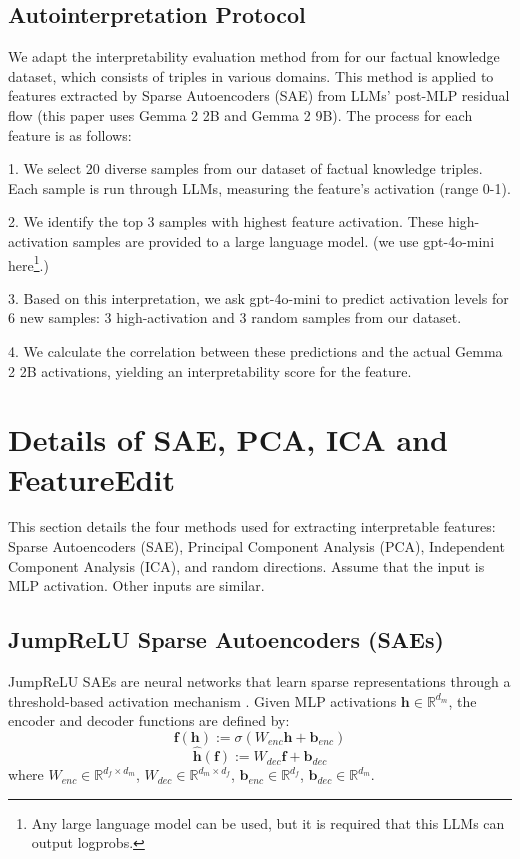 \subsection{Autointerpretation Protocol}
\label{subsection:appendix:Autointerpretation Protocol}
We adapt the interpretability evaluation method from \citet{bills2023language} for our factual knowledge dataset, which consists of triples in various domains. This method is applied to features extracted by Sparse Autoencoders (SAE) from LLMs' post-MLP residual flow (this paper uses Gemma 2 2B and Gemma 2 9B). The process for each feature is as follows:

1. We select 20 diverse samples from our dataset of factual knowledge triples. Each sample is run through LLMs, measuring the feature's activation (range 0-1).

2. We identify the top 3 samples with highest feature activation. These high-activation samples are provided to a large language model. (we use gpt-4o-mini here\footnote{Any large language model can be used, but it is required that this LLMs can output logprobs.}.)

3. Based on this interpretation, we ask gpt-4o-mini to predict activation levels for 6 new samples: 3 high-activation and 3 random samples from our dataset.

4. We calculate the correlation between these predictions and the actual Gemma 2 2B activations, yielding an interpretability score for the feature.
\section{Details of SAE, PCA, ICA and FeatureEdit}
\label{appendix:Details of SAE, PCA and ICA}

This section details the four methods used for extracting interpretable features: Sparse Autoencoders (SAE), Principal Component Analysis (PCA), Independent Component Analysis (ICA), and random directions. Assume that the input is MLP activation. Other inputs are similar.

\subsection{JumpReLU Sparse Autoencoders (SAEs)}
JumpReLU SAEs are neural networks that learn sparse representations through a threshold-based activation mechanism \citep{lieberum-etal-2024-gemma}. Given MLP activations $\mathbf{h} \in \mathbb{R}^{d_m}$, the encoder and decoder functions are defined by:
\begin{equation}
    \mathbf{f}(\mathbf{h}) := \sigma(W_{enc}\mathbf{h} + \mathbf{b}_{enc})
\end{equation}
\begin{equation}
    \hat{\mathbf{h}}(\mathbf{f}) := W_{dec}\mathbf{f} + \mathbf{b}_{dec}
\end{equation}
where $W_{enc} \in \mathbb{R}^{d_f \times d_m}$, $W_{dec} \in \mathbb{R}^{d_m \times d_f}$, $\mathbf{b}_{enc} \in \mathbb{R}^{d_f}$, $\mathbf{b}_{dec} \in \mathbb{R}^{d_m}$.

